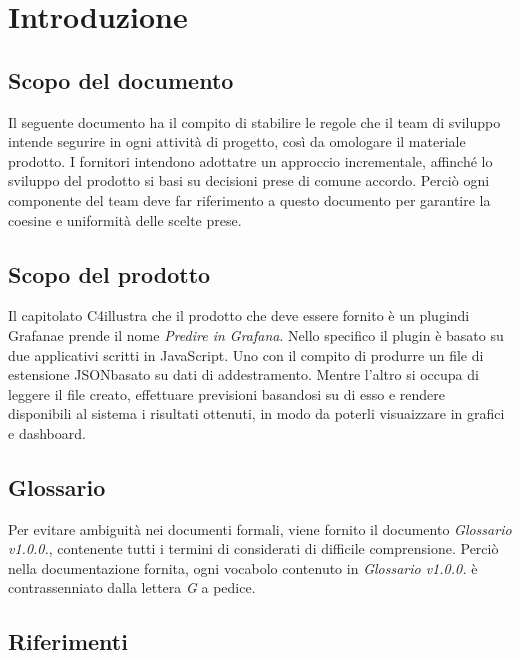 \section{Introduzione}

\subsection{Scopo del documento}
Il seguente documento ha il compito di stabilire le regole che il team di sviluppo intende segurire in ogni attività di progetto, così da omologare il materiale prodotto.
I fornitori intendono adottatre un approccio incrementale\glo, affinché lo sviluppo del prodotto si basi su decisioni prese di comune accordo. Perciò ogni componente del team deve far riferimento a questo documento per garantire la coesine e uniformità delle scelte prese.

\subsection{Scopo del prodotto}
Il capitolato {C4}\glo illustra che il prodotto che deve essere fornito è un plugin\glo    di Grafana\glo e prende il nome \textit{Predire in Grafana}. Nello specifico il plugin è basato su due applicativi scritti in JavaScript\glo. Uno con il compito di produrre un file  di estensione JSON\glo basato su dati di addestramento\glo{}. Mentre l'altro  si occupa di leggere il file creato, effettuare previsioni basandosi su di esso e rendere disponibili al sistema i risultati ottenuti, in modo da poterli 	visuaizzare in grafici e dashboard.
\subsection{Glossario}
Per evitare ambiguità nei documenti formali, viene fornito il documento \textit{Glossario v1.0.0.}, contenente tutti i termini di considerati di difficile comprensione. Perciò nella documentazione fornita, ogni vocabolo contenuto in \textit{Glossario v1.0.0.} è contrassenniato dalla lettera \textit{G} a pedice.
\subsection{Riferimenti}